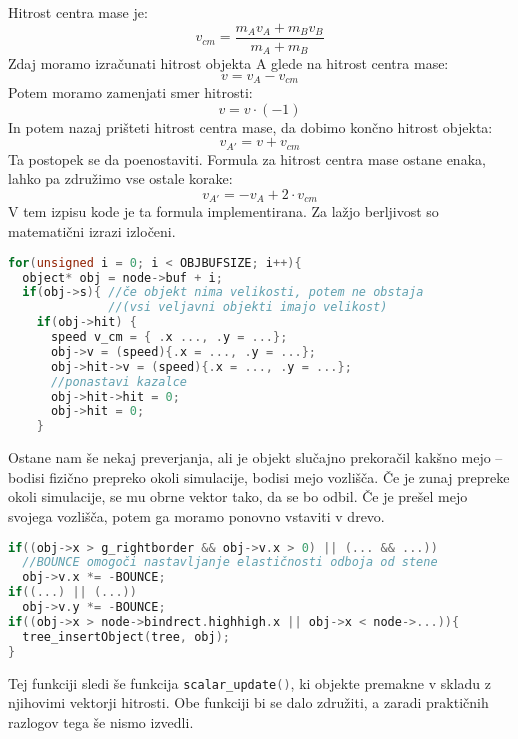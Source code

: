 \documentclass[a4paper,12pt]{article}
\begin{document}
Hitrost centra mase je: 
\[
v_{cm} = \frac{m_A v_A + m_B v_B}{m_A + m_B}
\]
Zdaj moramo izračunati hitrost objekta A glede na hitrost centra mase:
\[
v = v_A - v_{cm}
\]
Potem moramo zamenjati smer hitrosti:
\[
v = v\cdot(-1)
\]
In potem nazaj prišteti hitrost centra mase, da dobimo končno hitrost objekta:
\[
v_{A'} = v + v_{cm}
\]
Ta postopek se da poenostaviti. Formula za hitrost centra mase ostane enaka, lahko pa združimo vse ostale korake:
\[
v_{A'} = - v_A + 2\cdot v_{cm}
\]
V tem izpisu kode je ta formula implementirana. Za lažjo berljivost so matematični izrazi izločeni.
\begin{lstlisting}[caption={vector\_update() -- Upoštevanje trkov}, label=vectorupdate3, language=C]
for(unsigned i = 0; i < OBJBUFSIZE; i++){
  object* obj = node->buf + i;
  if(obj->s){ //če objekt nima velikosti, potem ne obstaja 
              //(vsi veljavni objekti imajo velikost)
    if(obj->hit) {
      speed v_cm = { .x ..., .y = ...};
      obj->v = (speed){.x = ..., .y = ...};
      obj->hit->v = (speed){.x = ..., .y = ...};
      //ponastavi kazalce
      obj->hit->hit = 0;
      obj->hit = 0;
    }
\end{lstlisting}
Ostane nam še nekaj preverjanja, ali je objekt slučajno prekoračil kakšno mejo -- bodisi fizično prepreko okoli simulacije,
bodisi mejo vozlišča. Če je zunaj prepreke okoli simulacije, se mu obrne vektor tako, da se bo odbil. Če je prešel
mejo svojega vozlišča, potem ga moramo ponovno vstaviti v drevo.
\begin{lstlisting}[caption={vector\_update() -- Odboji}, label=vectorupdate4, language=C]
if((obj->x > g_rightborder && obj->v.x > 0) || (... && ...))
  //BOUNCE omogoči nastavljanje elastičnosti odboja od stene
  obj->v.x *= -BOUNCE; 
if((...) || (...))
  obj->v.y *= -BOUNCE;
if((obj->x > node->bindrect.highhigh.x || obj->x < node->...)){
  tree_insertObject(tree, obj);
}
\end{lstlisting}
Tej funkciji sledi še funkcija \lstinline[language=C]{scalar_update()}, ki objekte premakne v skladu z
njihovimi vektorji hitrosti. Obe funkciji bi se dalo združiti, a zaradi praktičnih razlogov tega še nismo
izvedli.
\end{document}
